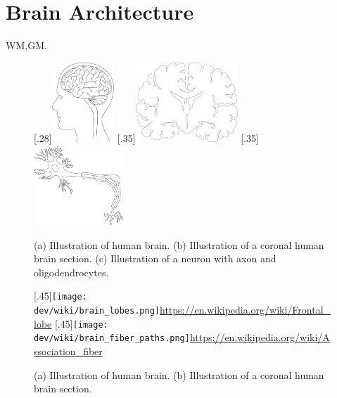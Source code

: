 \section{Brain Architecture}
% 
\ac{WM},\ac{GM}.
%
\begin{figure}[!t]
\centering
\subcaptionbox{}[.28\textwidth]{\includegraphics[height=3cm]{gfx/neuroanatomy/human-brain-profile.pdf}}
\subcaptionbox{}[.35\textwidth]{\includegraphics[height=3cm]{gfx/neuroanatomy/human-brain-section.pdf}}
\subcaptionbox{\label{fig:nerveFiber}}[.35\textwidth]{\includegraphics[height=3cm]{gfx/neuroanatomy/neuron-axon.pdf}}
\caption{(a) Illustration of human brain. (b) Illustration of a coronal human brain section. (c) Illustration of a neuron with axon and oligodendrocytes.}
\label{fig:human-brain}
\end{figure}
%
\begin{figure}[!t]
\centering
\hspace*{\fill}
\subcaptionbox{}[.45\textwidth]{\texttt{[image: dev/wiki/brain\_lobes.png]}\url{https://en.wikipedia.org/wiki/Frontal_lobe}}
\hspace*{\fill}
\subcaptionbox{\label{fig:nerveFiber}}[.45\textwidth]{\texttt{[image: dev/wiki/brain\_fiber\_paths.png]}\url{https://en.wikipedia.org/wiki/Association_fiber}}
\hspace*{\fill}
\caption{(a) Illustration of human brain. (b) Illustration of a coronal human brain section.}
\label{fig:human-fiber}
\end{figure}
% 

